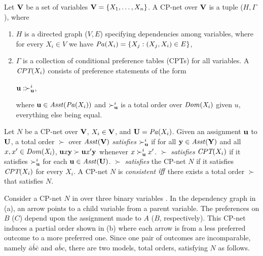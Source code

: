 \begin{definition}
\label{def:cpn}
	Let $\textbf{V}$ be a set of variables $\textbf{V}=\{X_1,\ldots,X_n\}$.
	A CP-net over $\textbf{V}$ is a tuple ($H, \Gamma$), where
	\begin{enumerate} \itemsep -4pt
		\item $H$ is a directed graph ($V,E$) specifying
					dependencies among variables,
					where for every $X_i \in V$ we have
					$\mathit{Pa}(X_i)=\{X_j:(X_j,X_i) \in E\}$,
		\item $\Gamma$ is a collection of 
					conditional preference tables (CPTs) for
					all variables.  A $\textit{CPT}(X_i)$ consists of preference
					statements of the form
					\begin{center}
						$\textbf{u} : \succ^i_{\textbf{u}}$,
					\end{center}
					where $\textbf{u} \in \mathit{Asst}(\mathit{Pa}(X_i))$ and $\succ^i_{\textbf{u}}$
					is a total order over $\it{Dom}(X_i)$ given $u$, everything else
					being equal.
	\end{enumerate}
\end{definition}




\begin{definition}
	Let $N$ be a CP-net over $\textbf{V}$, $X_i \in \textbf{V}$, and $\textbf{U} = \mathit{Pa}(X_i)$.
	Given an assignment $\textbf{u}$ to $\textbf{U}$,
	a total order $\succ$ over $\mathit{Asst}(\textbf{V})$ \textit{satisfies}
	$\succ^i_{\textbf{u}}$ if for all $\textbf{y} \in \mathit{Asst}(\textbf{Y})$ and all
	$x,x' \in \it{Dom}(X_i)$, $\textbf{u} \it{x} \textbf{y} \succ \textbf{u} \it{x'} \textbf{y}$ whenever
	$x \succ^i_{\textbf{u}} x'$.
	$\succ$ \textit{satisfies}
	$\textit{CPT}(X_i)$ if it satisfies $\succ^i_{\textbf{u}}$ for each
	$\textbf{u} \in \mathit{Asst}(\textbf{U})$.
	$\succ$ \textit{satisfies}
	the CP-net $N$ if it satisfies $\textit{CPT}(X_i)$ for every $X_i$.
	A CP-net $N$ is \textit{consistent} $\textit{iff}$ there exists a total order
	$\succ$ that satisfies $N$.
\end{definition}

Consider a CP-net $N$ in  over three binary variables \cite{bbdh03}.
In the dependency graph in (a), an arrow points
to a child variable from a parent variable.
The preferences on $B$ ($C$) depend upon the assignment made
to $A$ ($B$, respectively).
This CP-net induces a partial order shown in (b)
where each arrow is from a less preferred outcome to a more preferred one.
Since one pair of outcomes are incomparable,
namely $\bar{a}\bar{b}\bar{c}$ and $a\bar{b}c$,
there are two models, total orders, satisfying $N$ as follows.

